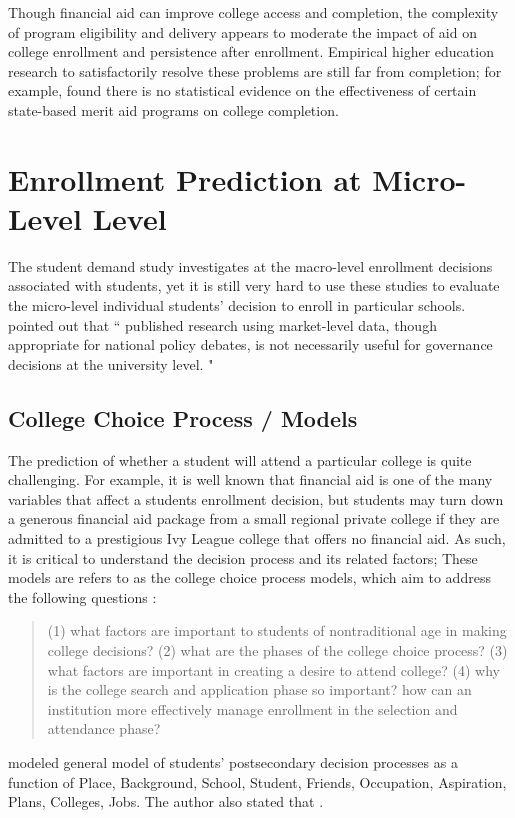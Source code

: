 \documentclass[12pt,english]{report}
\begin{document}
Though financial aid can improve college access and completion, the complexity of program eligibility and delivery appears to moderate the impact of aid on college enrollment and persistence after enrollment. Empirical higher education research  to satisfactorily resolve these problems are still far from completion; for example, \citet{Winters2015} found there is no statistical evidence on the effectiveness of certain state-based merit aid programs on college completion.

\section{Enrollment Prediction at Micro-Level Level}
The student demand study investigates at the macro-level enrollment decisions associated with students, yet it is still very hard to use these studies to evaluate the micro-level individual students' decision to enroll in particular schools. \citet{Carter2011} pointed out that `` published research using market-level data, though appropriate for national policy debates, is not necessarily useful for governance decisions at the university level. "

\subsection{College Choice Process / Models} 
The prediction of whether a student will attend a particular college is quite challenging.  For example,  it is well known that financial aid is one of the many variables that affect a students enrollment decision, but students may turn down a generous financial aid package from a small regional private college if they are admitted to a prestigious Ivy League college that offers no financial aid.  As such, it is critical to understand the decision process and its related factors; These models are refers to as the college choice process models, which aim to address the following questions \citep{Paulsen1990} :
\begin{quote}
(1) what factors are important to students of nontraditional age in making college decisions? (2) what are the phases of the college choice process? (3) what factors are important in creating a desire to attend college? (4) why is the college search and application phase so important? how can an institution more effectively manage enrollment in the selection and attendance phase?
\end{quote}

\citet{Jackson1978}  modeled general model of students' postsecondary decision processes as a function of Place, Background, School, Student, Friends, Occupation, Aspiration, Plans, Colleges, Jobs. The author also stated that .
\end{document}
